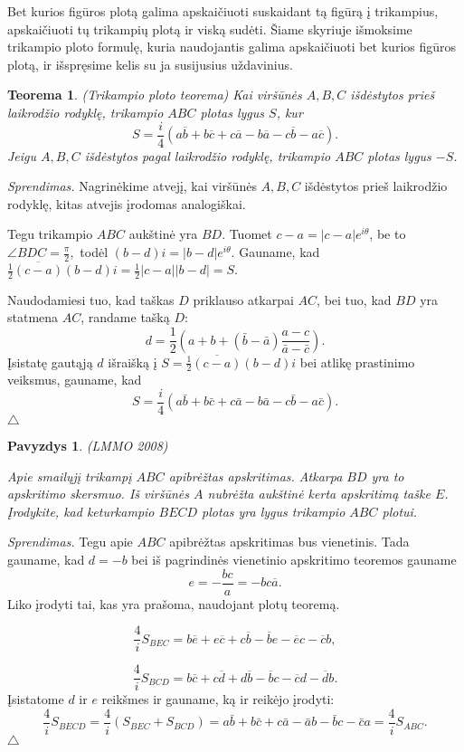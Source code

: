 \documentclass[11pt,a4paper,twoside]{book}
\newenvironment{sprendimas}{\noindent \textit{Sprendimas.}}{\hfill $\triangle$}
\newcounter{foo}[subsection]
\newtheorem{thmnr}{Teorema}
\newtheorem{pavnr}[foo]{Pavyzdys}
\theoremstyle{definition} \newtheorem*{api}{Apibrėžimas}
\theoremstyle{remark} \newtheorem*{pastaba}{Pastaba}
\begin{document}
Bet kurios figūros plotą galima apskaičiuoti suskaidant tą figūrą į trikampius, apskaičiuoti tų trikampių plotą ir viską sudėti. Šiame skyriuje išmoksime trikampio ploto formulę, kuria naudojantis galima apskaičiuoti bet kurios figūros plotą, ir išspręsime kelis su ja susijusius uždavinius.

\begin{thmnr} \textit{(Trikampio ploto teorema)}
Kai viršūnės $A, B, C$ išdėstytos prieš laikrodžio rodyklę, trikampio $ABC$ plotas lygus $S$, kur 
$$S=\frac{i}{4}(a\overline{b} +b\overline{c}+c\overline{a} - b\overline{a} -c\overline{b}-a\overline{c}).$$
Jeigu $A, B, C$ išdėstytos pagal laikrodžio rodyklę, trikampio $ABC$ plotas lygus $-S$.
\end{thmnr}

\begin{sprendimas}
Nagrinėkime atvejį, kai viršūnės $A, B, C$ išdėstytos prieš laikrodžio rodyklę, kitas atvejis įrodomas analogiškai.

Tegu trikampio $ABC$ aukštinė yra $BD$. Tuomet $c-a=|c-a|e^{i\theta}$, be to $\angle BDC = \frac {\pi}{2},$ todėl $(b-d)i=|b-d|e^{i\theta}$. Gauname, kad $\frac{1}{2}\overline{(c-a)} (b-d)i=\frac{1}{2}|c-a||b-d|=S.$

Naudodamiesi tuo, kad taškas $D$ priklauso atkarpai $AC$, bei tuo, kad $BD$ yra statmena $AC$, randame tašką $D$:
$$ d =\frac {1}{2}(a+b + (\bar{b}-\bar{a}) \frac{a-c}{ \bar{a}-\bar{c}}).$$
Įsistatę gautąją $d$ išraišką į $S=\frac{1}{2}\overline{(c-a)} (b-d)i$ bei atlikę prastinimo veiksmus, gauname, kad
$$S= \frac {i}{4}(a\bar{b}+ b \bar{c} + c \bar{a} - b\bar{a} - c \bar{b} - a \bar{c}).$$
\end{sprendimas}



\begin{pavnr}
(LMMO 2008)

Apie smailųjį trikampį $ABC$ apibrėžtas apskritimas. Atkarpa $BD$ yra to
apskritimo skersmuo. Iš viršūnės $A$ nubrėžta aukštinė kerta apskritimą
taške $E$. Įrodykite, kad keturkampio $BECD$ plotas yra lygus trikampio
$ABC$ plotui.
\end{pavnr}
\begin{sprendimas}
Tegu apie $ABC$ apibrėžtas apskritimas bus vienetinis. Tada gauname, kad $d = -b$ bei iš pagrindinės vienetinio apskritimo teoremos gauname
 $$ e= -\frac {bc}{a}= -bc \overline{a}.$$
Liko įrodyti tai, kas yra prašoma, naudojant plotų teoremą.

$$\frac{4}{i}S_{BEC}=b\overline{e}+e\overline{c}+c\overline{b}-\overline{b}e-\overline{e}c-\overline{c}b,$$

$$\frac{4}{i}S_{BCD}=b\overline{c}+c\overline{d}+d\overline{b}-\overline{b}c-\overline{c}d-\overline{d}b.$$
Įsistatome $d$ ir $e$ reikšmes ir gauname, ką ir reikėjo įrodyti:
$$ \frac{4}{i}S_{BECD}=\frac{4}{i}(S_{BEC}+S_{BCD})=   
a\bar b + b \bar c + c \bar a - \bar a b - \bar b c - \bar c a = \frac{4}{i}S_{ABC}.$$
\end{sprendimas}
\end{document}
